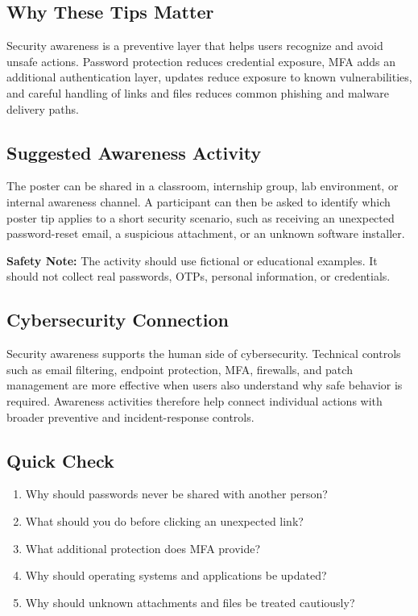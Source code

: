\documentclass[11pt,a4paper]{article}
\begin{document}
\subsection{Why These Tips Matter}

Security awareness is a preventive layer that helps users recognize and avoid unsafe actions. Password protection reduces credential exposure, MFA adds an additional authentication layer, updates reduce exposure to known vulnerabilities, and careful handling of links and files reduces common phishing and malware delivery paths.

\subsection{Suggested Awareness Activity}

The poster can be shared in a classroom, internship group, lab environment, or internal awareness channel. A participant can then be asked to identify which poster tip applies to a short security scenario, such as receiving an unexpected password-reset email, a suspicious attachment, or an unknown software installer.

\textbf{Safety Note:} The activity should use fictional or educational examples. It should not collect real passwords, OTPs, personal information, or credentials.

\subsection{Cybersecurity Connection}

Security awareness supports the human side of cybersecurity. Technical controls such as email filtering, endpoint protection, MFA, firewalls, and patch management are more effective when users also understand why safe behavior is required. Awareness activities therefore help connect individual actions with broader preventive and incident-response controls.

\subsection{Quick Check}

\begin{enumerate}
    \item Why should passwords never be shared with another person?
    \item What should you do before clicking an unexpected link?
    \item What additional protection does MFA provide?
    \item Why should operating systems and applications be updated?
    \item Why should unknown attachments and files be treated cautiously?
\end{enumerate}
\end{document}
